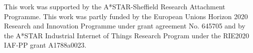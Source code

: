 \clearpage



\begin{dedication}
This work was supported
by the A*STAR-Sheffield Research Attachment Programme. This work was
partly funded by the European Unions Horizon 2020 Research and Innovation
Programme under grant agreement No. 645705 and by the A*STAR Industrial
Internet of Things Research Program under the RIE2020 IAF-PP grant
A1788a0023.

\end{dedication}